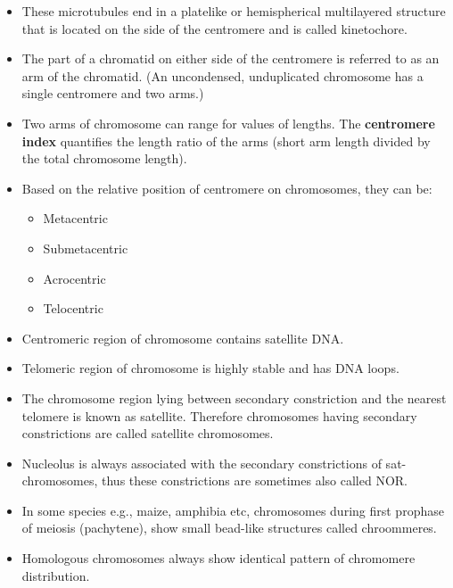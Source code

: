 \documentclass[11pt,ignorenonframetext,aspectratio=169]{beamer}
\providecommand{\tightlist}{%
  \setlength{\itemsep}{0pt}\setlength{\parskip}{0pt}}
\begin{document}
\begin{frame}{}
\protect\hypertarget{section-4}{}
\begin{itemize}
\tightlist
\item
  These microtubules end in a platelike or hemispherical multilayered
  structure that is located on the side of the centromere and is called
  kinetochore.
\item
  The part of a chromatid on either side of the centromere is referred
  to as an arm of the chromatid. (An uncondensed, unduplicated
  chromosome has a single centromere and two arms.)
\item
  Two arms of chromosome can range for values of lengths. The
  \textbf{centromere index} quantifies the length ratio of the arms
  (short arm length divided by the total chromosome length).
\item
  Based on the relative position of centromere on chromosomes, they can
  be:

  \begin{itemize}
  \tightlist
  \item
    Metacentric
  \item
    Submetacentric
  \item
    Acrocentric
  \item
    Telocentric
  \end{itemize}
\end{itemize}
\end{frame}

\begin{frame}{}
\protect\hypertarget{section-5}{}
\begin{itemize}
\tightlist
\item
  Centromeric region of chromosome contains satellite DNA.
\item
  Telomeric region of chromosome is highly stable and has DNA loops.
\item
  The chromosome region lying between secondary constriction and the
  nearest telomere is known as satellite. Therefore chromosomes having
  secondary constrictions are called satellite chromosomes.
\item
  Nucleolus is always associated with the secondary constrictions of
  sat-chromosomes, thus these constrictions are sometimes also called
  NOR.
\item
  In some species e.g., maize, amphibia etc, chromosomes during first
  prophase of meiosis (pachytene), show small bead-like structures
  called chroommeres.
\item
  Homologous chromosomes always show identical pattern of chromomere
  distribution.
\end{itemize}
\end{frame}
\end{document}
